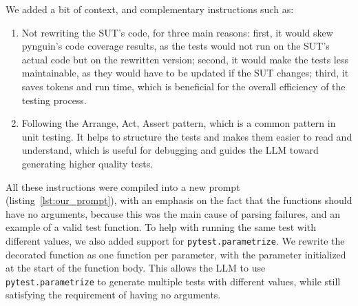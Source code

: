 \documentclass{article}
\begin{document}
We added a bit of context, and complementary instructions such as:
\begin{enumerate}
    \item Not rewriting the SUT's code, for three main reasons:
        first, it would skew pynguin's code coverage results, as the tests would not run on the SUT's actual code but on the rewritten version;
        second, it would make the tests less maintainable, as they would have to be updated if the SUT changes;
        third, it saves tokens and run time, which is beneficial for the overall efficiency of the testing process.
    \item Following the Arrange, Act, Assert pattern, which is a common pattern in unit testing. It helps to structure the tests and makes them easier to read and understand, which is useful for debugging and guides the LLM toward generating higher quality tests.
\end{enumerate}

All these instructions were compiled into a new prompt (listing~\ref{lst:our_prompt}), with an emphasis on the fact that the functions should have no arguments, because this was the main cause of parsing failures, and an example of a valid test function.
To help with running the same test with different values, we also added support for \texttt{pytest.\allowbreak{}parametrize}. We rewrite the decorated function as one function per parameter, with the parameter initialized at the start of the function body. This allows the LLM to use \texttt{pytest.\allowbreak{}parametrize} to generate multiple tests with different values, while still satisfying the requirement of having no arguments.
\end{document}
